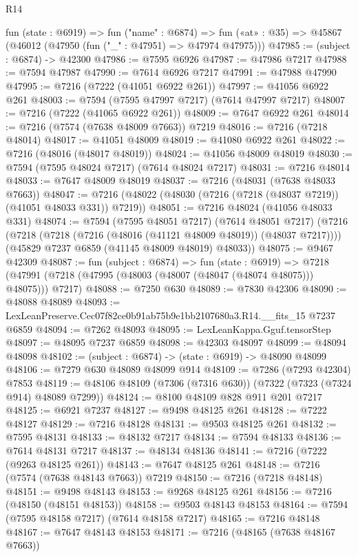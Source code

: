 \begin{lexlean}{R14}
\begin{coremodule}
  fun (state : @6919) =>
  fun ("name" : @6874) =>
  fun («at» : @35) => @45867 (@46012 (@47950 (fun ("_" : @47951) => @47974 @47975)))
@47985 := (subject : @6874) -> @42300
@47986 := @7595 @6926
@47987 := @47986 @7217
@47988 := @7594 @47987
@47990 := @7614 @6926 @7217
@47991 := @47988 @47990
@47995 := @7216 (@7222 (@41051 @6922 @261))
@47997 := @41056 @6922 @261
@48003 := @7594 (@7595 @47997 @7217) (@7614 @47997 @7217)
@48007 := @7216 (@7222 (@41065 @6922 @261))
@48009 := @7647 @6922 @261
@48014 := @7216 (@7574 (@7638 @48009 @7663)) @7219
@48016 := @7216 (@7218 @48014)
@48017 := @41051 @48009
@48019 := @41080 @6922 @261
@48022 := @7216 (@48016 (@48017 @48019))
@48024 := @41056 @48009 @48019
@48030 := @7594 (@7595 @48024 @7217) (@7614 @48024 @7217)
@48031 := @7216 @48014
@48033 := @7647 @48009 @48019
@48037 := @7216 (@48031 (@7638 @48033 @7663))
@48047 := @7216 (@48022 (@48030 (@7216 (@7218 (@48037 @7219)) (@41051 @48033 @331)) @7219))
@48051 := @7216 @48024 (@41056 @48033 @331)
@48074 := @7594
    (@7595 @48051 @7217)
    (@7614 @48051 @7217)
    (@7216
      (@7218 (@7218 (@7216 (@48016 (@41121 @48009 @48019)) (@48037 @7217))))
      (@45829 @7237 @6859 (@41145 @48009 @48019) @48033))
@48075 := @9467 @42309
@48087 := fun (subject : @6874) =>
  fun (state : @6919) =>
  @7218 (@47991 (@7218 (@47995 (@48003 (@48007 (@48047 (@48074 @48075))) @48075))) @7217)
@48088 := @7250 @630
@48089 := @7830 @42306
@48090 := @48088 @48089
@48093 := LexLeanPreserve.Cec07f82ce0b91ab75b9e1bb2107680a3.R14.__fits_15 @7237 @6859
@48094 := @7262 @48093
@48095 := LexLeanKappa.Gguf.tensorStep
@48097 := @48095 @7237 @6859
@48098 := @42303 @48097
@48099 := @48094 @48098
@48102 := (subject : @6874) -> (state : @6919) -> @48090 @48099
@48106 := @7279 @630 @48089 @48099 @914
@48109 := @7286 (@7293 @42304) @7853
@48119 := @48106 @48109 (@7306 (@7316 @630)) (@7322 (@7323 (@7324 @914) @48089 @7299))
@48124 := @8100 @48109 @828 @911 @201 @7217
@48125 := @6921 @7237
@48127 := @9498 @48125 @261
@48128 := @7222 @48127
@48129 := @7216 @48128
@48131 := @9503 @48125 @261
@48132 := @7595 @48131
@48133 := @48132 @7217
@48134 := @7594 @48133
@48136 := @7614 @48131 @7217
@48137 := @48134 @48136
@48141 := @7216 (@7222 (@9263 @48125 @261))
@48143 := @7647 @48125 @261
@48148 := @7216 (@7574 (@7638 @48143 @7663)) @7219
@48150 := @7216 (@7218 @48148)
@48151 := @9498 @48143
@48153 := @9268 @48125 @261
@48156 := @7216 (@48150 (@48151 @48153))
@48158 := @9503 @48143 @48153
@48164 := @7594 (@7595 @48158 @7217) (@7614 @48158 @7217)
@48165 := @7216 @48148
@48167 := @7647 @48143 @48153
@48171 := @7216 (@48165 (@7638 @48167 @7663))

\end{coremodule}
\end{lexlean}
